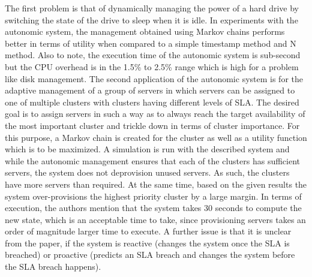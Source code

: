 The first problem is that of dynamically managing the power of a hard drive by switching the state of the drive to sleep when it is idle. In experiments with the autonomic system, the management obtained using Markov chains performs better in terms of utility when compared to a simple timestamp method and N method. Also to note, the execution time of the autonomic system is sub-second but the CPU overhead is in the 1.5\% to 2.5\% range which is high for a problem like disk management. The second application of the autonomic system is for the adaptive management of a group of servers in which servers can be assigned to one of multiple clusters with clusters having different levels of SLA. The desired goal is to assign servers in such a way as to always reach the target availability of the most important cluster and trickle down in terms of cluster importance. For this purpose, a Markov chain is created for the cluster as well as a utility function which is to be maximized. A simulation is run with the described system and while the autonomic management ensures that each of the clusters has sufficient servers, the system does not deprovision unused servers. As such, the clusters have more servers than required. At the same time, based on the given results the system over-provisions the highest priority cluster by a large margin. In terms of execution, the authors mention that the system takes 30 seconds to compute the new state, which is an acceptable time to take, since provisioning servers takes an order of magnitude larger time to execute. A further issue is that it is unclear from the paper, if the system is reactive (changes the system once the SLA is breached) or proactive (predicts an SLA breach and changes the system before the SLA breach happens).

